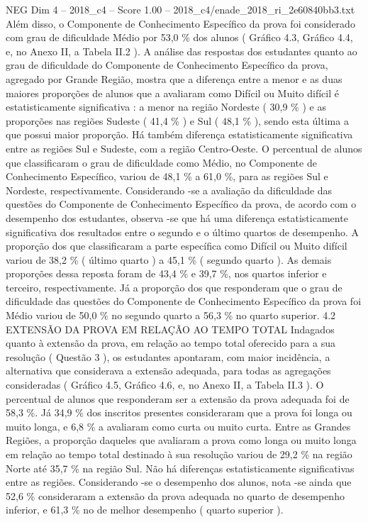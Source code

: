 \begin{textsample}{NEG Dim 4 – 2018\_c4 – Score 1.00 – 2018\_c4/enade\_2018\_ri\_2e60840bb3.txt}
Além disso, o Componente de Conhecimento Específico da prova foi considerado com grau de dificuldade Médio por 53,0 \% dos alunos ( Gráfico 4.3, Gráfico 4.4, e, no Anexo II, a Tabela II.2 ).
A análise das respostas dos estudantes quanto ao grau de dificuldade do Componente de Conhecimento Específico da prova, agregado por Grande Região, mostra que a diferença entre a menor e as duas maiores proporções de alunos que a avaliaram como Difícil ou Muito difícil é estatisticamente significativa : a menor na região Nordeste ( 30,9 \% ) e as proporções nas regiões Sudeste ( 41,4 \% ) e Sul ( 48,1 \% ), sendo esta última a que possui maior proporção.
Há também diferença estatisticamente significativa entre as regiões Sul e Sudeste, com a região Centro-Oeste.
O percentual de alunos que classificaram o grau de dificuldade como Médio, no Componente de Conhecimento Específico, variou de 48,1 \% a 61,0 \%, para as regiões Sul e Nordeste, respectivamente.
Considerando -se a avaliação da dificuldade das questões do Componente de Conhecimento Específico da prova, de acordo com o desempenho dos estudantes, observa -se que há uma diferença estatisticamente significativa dos resultados entre o segundo e o último quartos de desempenho.
A proporção dos que classificaram a parte específica como Difícil ou Muito difícil variou de 38,2 \% ( último quarto ) a 45,1 \% ( segundo quarto ).
As demais proporções dessa reposta foram de 43,4 \% e 39,7 \%, nos quartos inferior e terceiro, respectivamente.
Já a proporção dos que responderam que o grau de dificuldade das questões do Componente de Conhecimento Específico da prova foi Médio variou de 50,0 \% no segundo quarto a 56,3 \% no quarto superior. 4.2 EXTENSÃO DA PROVA EM RELAÇÃO AO TEMPO TOTAL Indagados quanto à extensão da prova, em relação ao tempo total oferecido para a sua resolução ( Questão 3 ), os estudantes apontaram, com maior incidência, a alternativa que considerava a extensão adequada, para todas as agregações consideradas ( Gráfico 4.5, Gráfico 4.6, e, no Anexo II, a Tabela II.3 ).
O percentual de alunos que responderam ser a extensão da prova adequada foi de 58,3 \%.
Já 34,9 \% dos inscritos presentes consideraram que a prova foi longa ou muito longa, e 6,8 \% a avaliaram como curta ou muito curta.
Entre as Grandes Regiões, a proporção daqueles que avaliaram a prova como longa ou muito longa em relação ao tempo total destinado à sua resolução variou de 29,2 \% na região Norte até 35,7 \% na região Sul.
Não há diferenças estatisticamente significativas entre as regiões.
Considerando -se o desempenho dos alunos, nota -se ainda que 52,6 \% consideraram a extensão da prova adequada no quarto de desempenho inferior, e 61,3 \% no de melhor desempenho ( quarto superior ).

\end{textsample}

